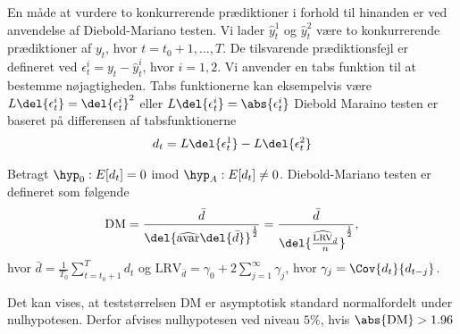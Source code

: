 En måde at vurdere to konkurrerende prædiktioner i forhold til hinanden er ved anvendelse af Diebold-Mariano testen. 
Vi lader $\widehat{y}_t^1$ og  $\widehat{y}_t^2$ være to konkurrerende prædiktioner af $y_t$, hvor $t = t_0 + 1, \dots, T$. 
De tilsvarende prædiktionsfejl er defineret ved $\epsilon^i_t = y_t - \widehat{y}^i_t $,  hvor $i = 1, 2$. 
Vi anvender en tabs funktion til at bestemme nøjagtigheden. Tabs funktionerne kan eksempelvis være $ L\del{\epsilon^i_t} = \del{\epsilon^i_t }^2 $ eller $L\del{\epsilon^i_t}  = \abs{\epsilon^i_t }$
%
Diebold Maraino testen er baseret på differensen af tabsfunktionerne
%
\begin{align*}
d_t = L\del{\epsilon^1_t} - L\del{\epsilon^2_t}
\end{align*}
%
%
\begin{defn}
Betragt $\hyp_0 : E[d_t] = 0$ imod  $\hyp_A : E[d_t] \neq 0$. 
Diebold-Mariano testen er defineret som følgende 
\begin{align*}
\text{DM} = \frac{\bar{d}}{\del{\widehat{\text{avar}}\del{\bar{d}}}^{\frac{1}{2}}} =  \frac{\bar{d}}{\del{\frac{\widehat{\text{LRV}}_{\bar{d}}}{n}}^{\frac{1}{2}}},
\end{align*}
hvor $\bar{d} = \frac{1}{T_0} \sum^{T}_{t = t_0 +1} d_t$ og $\text{LRV}_{\bar{d}} = \gamma_0 + 2\sum_{j = 1}^{\infty} \gamma_j$, hvor $\gamma_j = \Cov{d_t}{d_{t-j}}$. 
\end{defn}
%
Det kan vises, at teststørrelsen DM er asymptotisk standard normalfordelt under nulhypotesen. Derfor afvises nulhypotesen ved niveau $5 \%$, hvis $\abs{\text{DM}} > 1.96$
